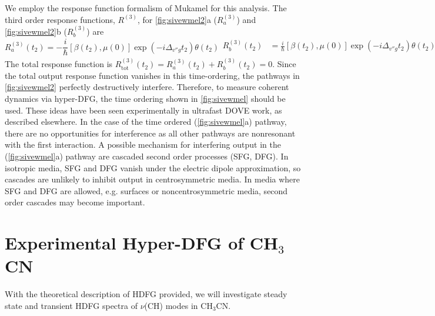 \documentclass[aip, jcp, reprint, onecolumn]{revtex4-2}
\begin{document}
We employ the response function formalism of Mukamel for this analysis. \cite{RN287}
The third order response functions, $R^{(3)}$, for \autoref{fig:sivewmel2}a ($R^{(3)}_{a}$) and \autoref{fig:sivewmel2}b ($R^{(3)}_{b}$) are 
\begin{subequations}
	\begin{equation} \label{mixing:a}
		R^{(3)}_{a} (t_2) = -\frac{i}{\hbar} [\beta(t_2), \mu(0)] \exp(-i\Delta_{v''g}t_2) \theta(t_2)
	\end{equation}
	\begin{equation}\label{mixing:b}
		\begin{split}
			R^{(3)}_{b} (t_2) & = \frac{i}{\hbar} [\beta(t_2), \mu(0)] \exp(-i\Delta_{v''g}t_2) \theta(t_2)\\
		\end{split}
	\end{equation}
\end{subequations}
The total response function is $R^{(3)}_\text{tot} (t_2) = R^{(3)}_{a} (t_2) + R^{(3)}_{b} (t_2) = 0$. 
Since the total output response function vanishes in this time-ordering, the pathways in \autoref{fig:sivewmel2} perfectly destructively interfere.
Therefore, to measure coherent dynamics via hyper-DFG, the time ordering shown in \autoref{fig:sivewmel} should be used.
These ideas have been seen experimentally in ultrafast DOVE work, as described elsewhere. \cite{RN367, McDonnell2024}
In the case of the time ordered (\autoref{fig:sivewmel}a) pathway, there are no opportunities for interference as all other pathways are nonresonant with the first interaction. 
A possible mechanism for interfering output in the (\autoref{fig:sivewmel}a) pathway are cascaded second order processes (SFG, DFG). \cite{RN243, RN300}
In isotropic media, SFG and DFG vanish under the electric dipole approximation,\cite{RN231} so cascades are unlikely to inhibit output in centrosymmetric media.
In media where SFG and DFG are allowed, e.g. surfaces or noncentrosymmetric media, second order cascades may become important. 



\section{Experimental Hyper-DFG of CH$_3$CN}
With the theoretical description of HDFG provided, we will investigate steady state and transient HDFG spectra of $\nu$(CH) modes in CH$_3$CN. %
\end{document}
